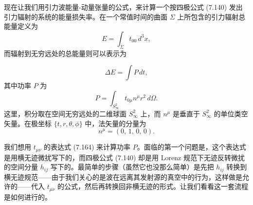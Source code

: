 现在让我们用引力波能量-动量张量的公式，来计算一个按四极公式 (7.140) 发出引力辐射的系统的能量损失率。在一个常值时间的曲面 $\Sigma$ 上所包含的引力辐射总能量定义为
\begin{equation*}
E = \int_{\Sigma} t_{00}\, d^3x,
\tag{7.173}
\end{equation*}
而辐射到无穷远处的总能量则可以表示为


\begin{equation*}
\Delta E = \int P\, dt,
\tag{7.174}
\end{equation*}
其中功率 $P$ 为
\begin{equation*}
P = \int_{S^2_\infty} t_{0\mu}n^\mu r^2\, d\Omega.
\tag{7.175}
\end{equation*}
这里，积分取在空间无穷远处的二维球面 $S^2_\infty$ 上，而 $n^\mu$ 是垂直于 $S^2_\infty$ 的单位类空矢量。在极坐标 $\{t, r, \theta, \phi\}$ 中，法矢量的分量为
\begin{equation*}
n^\mu = (0,\, 1,\, 0,\, 0).
\tag{7.176}
\end{equation*}

我们想用 $t_{\mu\nu}$ 的表达式 (7.164) 来计算功率 $P$。面临的第一个问题是，这个表达式是用横无迹微扰写下的，而四极公式 (7.140) 却是用 Lorenz 规范下无迹反转微扰的空间分量 $h_{ij}$ 写下的。最简单的步骤（虽然它也没那么简单）是先把 $h_{ij}$ 转换到横无迹规范——由于我们关心的是波在远离其发射源的真空中的行为，这样做是允许的——代入 $t_{\mu\nu}$ 的公式，然后再转换回非横无迹的形式。让我们看看这一套流程是如何进行的。


